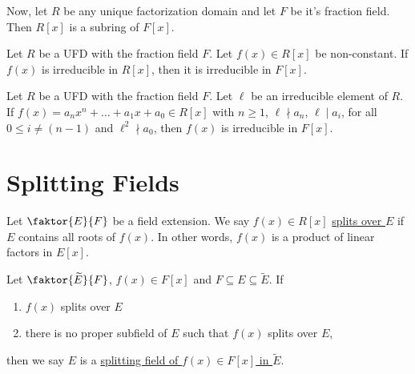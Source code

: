 \documentclass[11pt]{article}
\newcommand{\quotient}[2]{\faktor{#1}{#2}}
\begin{document}
\sectionline
Now, let $R$ be any unique factorization domain and let $F$ be it's fraction
field. Then $R[x]$ is a subring of $F[x]$.
\begin{lemma*} 
Let $R$ be a UFD with the fraction field $F$. Let $f(x) \in R[x]$ be
non-constant. If $f(x)$ is irreducible in $R[x]$, then it is irreducible in
$F[x]$.
\end{lemma*}
\begin{theorem} 
Let $R$ be a UFD with the fraction field $F$. Let $\ell$ be an irreducible
element of $R$. If $f(x) = a_nx^n + \dots + a_1x + a_0 \in R[x]$ with $n \geq
1$, $\ell \nmid a_n$, $\ell \mid a_i$, for all $0 \leq i \neq (n-1)$ and
$\ell^2 \nmid a_0$, then $f(x)$ is irreducible in $F[x]$.
\end{theorem}

\pagebreak
\section{Splitting Fields}
\begin{definition}
Let $\quotient{E}{F}$ be a field extension. We say $f(x) \in R[x]$
\underline{splits over $E$} if $E$ contains all roots of $f(x)$. In other words,
$f(x)$ is a product of linear factors in $E[x]$.
\end{definition}
\begin{definition}
Let $\quotient{\tilde{E}}{F}$, $f(x) \in F[x]$ and $F \subseteq E \subseteq
\tilde E$. If
\begin{enumerate}
\item $f(x)$ splits over $E$
\item there is no proper subfield of $E$ such that $f(x)$ splits over $E$, 
\end{enumerate}
then
we say $E$ is a \underline{splitting field of $f(x) \in F[x]$ in $\tilde E$}.
\end{definition}
\end{document}
